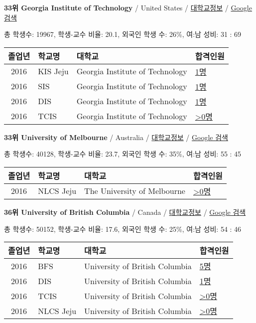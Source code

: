 \documentclass[13pt,]{article}
\begin{document}
\textbf{33위 Georgia Institute of Technology} / United States /
\href{https://www.timeshighereducation.com/world-university-rankings/georgia-institute-of-technology?ranking-dataset=589595}{대학교정보}
/
\href{http://www.google.com/search?q=Georgia+Institute+of+Technology}{Google
검색}

총 학생수: 19967, 학생-교수 비율: 20.1, 외국인 학생 수: 26\%, 여:남
성비: 31 : 69

\begin{longtable}[]{@{}clll@{}}
\toprule
졸업년 & 학교명 & 대학교 & 합격인원\tabularnewline
\midrule
\endhead
2016 & KIS Jeju & Georgia Institute of Technology &
\href{http://cafe.naver.com/assarabia/11596}{1명}\tabularnewline
2016 & SIS & Georgia Institute of Technology &
\href{http://cafe.naver.com/assarabia/11589}{1명}\tabularnewline
2016 & DIS & Georgia Institute of Technology &
\href{http://cafe.naver.com/assarabia/11591}{1명}\tabularnewline
2016 & TCIS & Georgia Institute of Technology &
\href{http://cafe.naver.com/assarabia/11598}{\textgreater{}0명}\tabularnewline
\bottomrule
\end{longtable}

\textbf{33위 University of Melbourne} / Australia /
\href{https://www.timeshighereducation.com/world-university-rankings/university-of-melbourne?ranking-dataset=589595}{대학교정보}
/ \href{http://www.google.com/search?q=University+of+Melbourne}{Google
검색}

총 학생수: 40128, 학생-교수 비율: 23.7, 외국인 학생 수: 35\%, 여:남
성비: 55 : 45

\begin{longtable}[]{@{}clll@{}}
\toprule
졸업년 & 학교명 & 대학교 & 합격인원\tabularnewline
\midrule
\endhead
2016 & NLCS Jeju & The University of Melbourne &
\href{http://cafe.naver.com/assarabia/11592}{\textgreater{}0명}\tabularnewline
\bottomrule
\end{longtable}

\textbf{36위 University of British Columbia} / Canada /
\href{https://www.timeshighereducation.com/world-university-rankings/university-of-british-columbia?ranking-dataset=589595}{대학교정보}
/
\href{http://www.google.com/search?q=University+of+British+Columbia}{Google
검색}

총 학생수: 50152, 학생-교수 비율: 17.6, 외국인 학생 수: 25\%, 여:남
성비: 54 : 46

\begin{longtable}[]{@{}clll@{}}
\toprule
졸업년 & 학교명 & 대학교 & 합격인원\tabularnewline
\midrule
\endhead
2016 & BFS & University of British Columbia &
\href{http://cafe.naver.com/assarabia/11597}{5명}\tabularnewline
2016 & DIS & University of British Columbia &
\href{http://cafe.naver.com/assarabia/11591}{1명}\tabularnewline
2016 & TCIS & University of British Columbia &
\href{http://cafe.naver.com/assarabia/11598}{\textgreater{}0명}\tabularnewline
2016 & NLCS Jeju & University of British Columbia &
\href{http://cafe.naver.com/assarabia/11592}{\textgreater{}0명}\tabularnewline
\bottomrule
\end{longtable}
\end{document}
